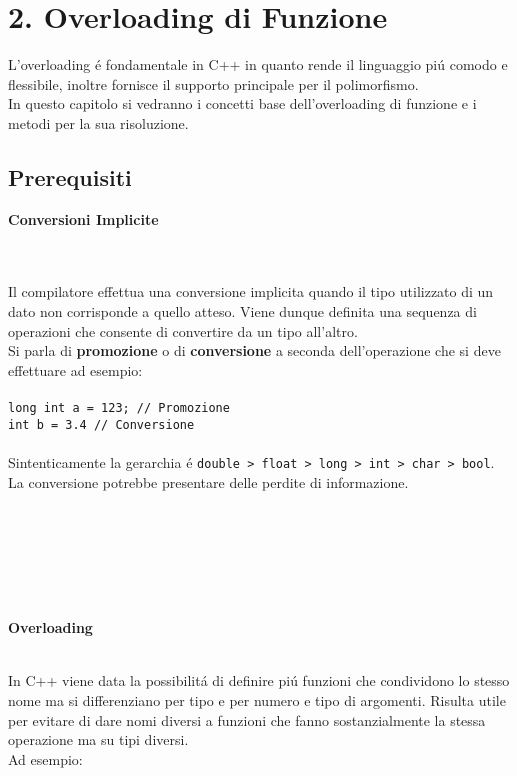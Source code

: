 \documentclass{article}
\begin{document}
\section*{\textcolor{blu}{2. Overloading di Funzione}} 
L'overloading \'e fondamentale in C++ in quanto rende il linguaggio pi\'u comodo e flessibile, inoltre fornisce il supporto principale per il polimorfismo.\\ In questo capitolo si vedranno i concetti base dell'overloading di funzione e i metodi per la sua risoluzione.
\textcolor{grigio}{\section*{Prerequisiti\\}} 
\textcolor{grigio}{\begin{large}\textbf{Conversioni Implicite}\end{large} \\ \\Il compilatore effettua una conversione implicita quando il tipo utilizzato di un dato non corrisponde a quello atteso. Viene dunque definita una sequenza di operazioni che consente di convertire da un tipo all'altro.\\Si parla di \textbf{promozione} o di \textbf{conversione} a seconda dell'operazione che si deve effettuare ad esempio:\\ \\ \texttt{long int a = 123; // Promozione\\int b = 3.4 // Conversione}\\ \\Sintenticamente la gerarchia \'e \texttt{double > float > long > int > char > bool}. \\La conversione potrebbe presentare delle perdite di informazione.}
\\ \\ \\ \\ \\
\begin{large}\textbf{\textcolor{blu}{Overloading}} \\ \\ \end{large}
In C++ viene data la possibilit\'a di definire pi\'u funzioni che condividono lo stesso nome ma si differenziano per tipo e per numero e tipo di argomenti. Risulta utile per evitare di dare nomi diversi a funzioni che fanno sostanzialmente la stessa operazione ma su tipi diversi.\\ Ad esempio: \\
\end{document}
